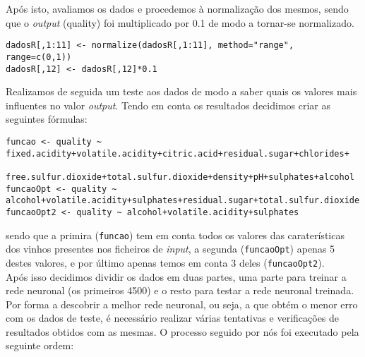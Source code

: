 \documentclass{article}
\begin{document}
Após isto, avaliamos os dados e procedemos à normalização dos mesmos, sendo que o \textit{output} (quality) foi multiplicado por 0.1 de modo a tornar-se normalizado.

\begin{verbatim}
dadosR[,1:11] <- normalize(dadosR[,1:11], method="range", range=c(0,1))
dadosR[,12] <- dadosR[,12]*0.1
\end{verbatim}

Realizamos de seguida um teste aos dados de modo a saber quais os valores mais influentes no valor \textit{output}. Tendo em conta os resultados decidimos criar as seguintes fórmulas:

\begin{verbatim}
funcao <- quality ~ fixed.acidity+volatile.acidity+citric.acid+residual.sugar+chlorides+
                    free.sulfur.dioxide+total.sulfur.dioxide+density+pH+sulphates+alcohol
funcaoOpt <- quality ~ alcohol+volatile.acidity+sulphates+residual.sugar+total.sulfur.dioxide
funcaoOpt2 <- quality ~ alcohol+volatile.acidity+sulphates
\end{verbatim}

sendo que a primira (\texttt{funcao}) tem em conta todos os valores das caraterísticas dos vinhos presentes nos ficheiros de \textit{input}, a segunda (\texttt{funcaoOpt}) apenas 5 destes valores, e por último apenas temos em conta 3 deles (\texttt{funcaoOpt2}).\\
Após isso decidimos dividir os dados em duas partes, uma parte para treinar a rede neuronal (os primeiros 4500) e o resto para testar a rede neuronal treinada.
Por forma a descobrir a melhor rede neuronal, ou seja, a que obtém o menor erro com os dados de teste, é necessário realizar várias tentativas e verificações de resultados obtidos com as mesmas. O processo seguido por nós foi executado pela seguinte ordem:
\end{document}
